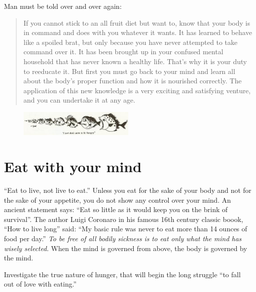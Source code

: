\documentclass[landscape,twocolumn,letterpaper]{article}
\begin{document}
Man must be told over and over again:
\begin{quote} If you cannot stick to an all fruit diet but want to,
know that your body is in command and does with you whatever it
wants. It has learned to behave like a spoiled brat, but only because
you have never attempted to take command over it. It has been brought
up in your confused mental household that has never known a healthy
life. That's why it is your duty to reeducate it.  But first you must
go back to your mind and learn all about the body's proper function
and how it is nourished correctly. The application of this new
knowledge is a very exciting and satisfying venture, and you can
undertake it at any age.
\end{quote}

\begin{figure} \centering
  \includegraphics[width=0.5\textwidth,bb= 0 0 465 104]{p19.jpg}
\end{figure}


\section{Eat with your mind}

``Eat to live, not live to eat.'' Unless you eat for the sake of your
body and not for the sake of your appetite, you do not show any
control over your mind. An ancient statement says: ``Eat so little as
it would keep you on the brink of survival''. The author Luigi
Coronaro in his famous 16th century classic boook, ``How to live
long'' said: ``My basic rule was never to eat more than 14 ounces of
food per day.'' \emph{To be free of all bodily sickness is to eat only
what the mind has wisely selected.} When the mind is governed from
above, the body is governed by the mind.

Investigate the true nature of hunger, that will begin the long
struggle ``to fall out of love with eating.''
\end{document}

